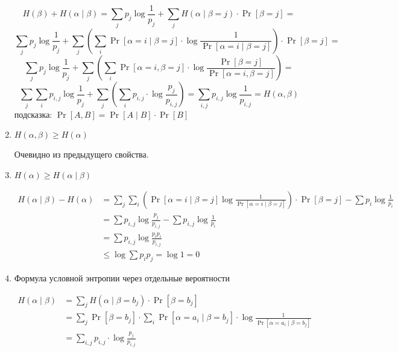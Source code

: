 \begin{prop}
\begin{enumerate}
\begin{proof*}
		    \[
    		    H( \beta ) + H( \alpha  \mid \beta ) = \sum_j p_j \log \frac{1}{p_j} + \sum_{j} H ( \alpha  \mid \beta = j) \cdot  \Pr[\beta = j] = \]\[ \sum_j p_j \log \frac{1}{p_j} + \sum_{j} \left(\sum_{i}^{} \Pr[ \alpha = i \mid  \beta  = j] \cdot  \log \frac{1}{\Pr [ \alpha  = i \mid \beta  = j]}\right) \cdot  \Pr[\beta = j] = 
		    \]
		    \[ 
		        \sum_j p_j \log \frac{1}{p_j} + \sum_{j} \left(\sum_{i}^{} \Pr[ \alpha = i,  \beta  = j] \cdot  \log \frac{\Pr [\beta = j]}{\Pr [ \alpha  = i,  \beta  = j]}\right) = 
		    \]
		     \[ 
		         \sum_j \sum_i p_{i,j} \log \frac{1}{p_j} + \sum_{j} \left(\sum_{i}^{} p_{i,j} \cdot  \log \frac{p_j}{p_{i,j}}\right) = \sum_{i,j}p_{i,j}\log \frac{1}{p_{i,j}} = H(\alpha, \beta)
		    \]
		    подсказка: $\Pr [A, B] = \Pr[A \mid B] \cdot \Pr[B]$
		\end{proof*}
		\item $ H( \alpha , \beta ) \ge H( \alpha )$
		\begin{proof*}
		    Очевидно из предыдущего свойства.
		\end{proof*}
		\item $ H( \alpha ) \ge  H ( \alpha \mid \beta )$
			\begin{proof*}
			    \begin{align*}
    			    H( \alpha \mid \beta ) - H ( \alpha ) 
    			    &= \sum_j \sum_i\left( \Pr [\alpha = i \mid \beta = j] \log \frac{1}{ \Pr [ \alpha = i \mid \beta = j]}\right)\cdot \Pr[\beta = j] - \sum p_{i} \log \frac{1}{p_i} \\
    				&= \sum p_{i,j}\log\frac{p_j}{p_{i,j}} - \sum p_{i,j}\log\frac{1}{p_i} \\
    				&= \sum p_{i, j} \log \frac{p_i p_i}{p_{i,j}} \\
    				&\le \log \sum p_i p_j = \log 1 = 0 \tag{по нер-ву Йенсена}
			    \end{align*}
			\end{proof*}
		\item Формула условной энтропии через отдельные вероятности
		    \begin{proof*}
    			\begin{align*}
    				H( \alpha \mid \beta ) 
    				&= \sum_j H(\alpha \mid \beta = b_j) \cdot \Pr[\beta = b_j] \\
    				&= \sum_{j} \Pr[ \beta = b_j] \cdot  \sum_{i}^{} \Pr[ \alpha = a_i \mid \beta = b_j] \cdot \log \frac{1}{\Pr[ \alpha = a_i \mid \beta = b_j]} \\
    				&= \sum_{i, j}^{} p_{i,j} \cdot \log \frac{p_{j}}{p_{i, j}}

\end{align*}
\end{proof*}
\end{enumerate}
\end{prop}
